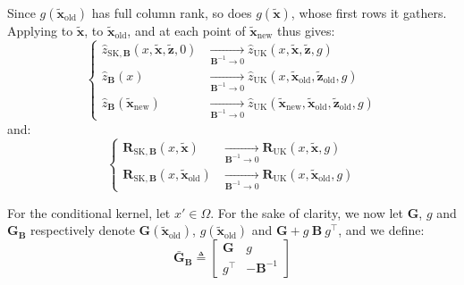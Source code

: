 Since $g(\tilde{\mathbf{x}}_{\mathrm{old}})$ has full column rank, so does $g(\tilde{\mathbf{x}})$, whose first rows it gathers. Applying  to $\tilde{\mathbf{x}}$, to $\tilde{\mathbf{x}}_{\mathrm{old}}$, and at each point of $\tilde{\mathbf{x}}_{\mathrm{new}}$ thus gives:
\begin{equation}
	\left\{\begin{aligned}
	\hat{z}_{\mathrm{SK},\mathbf{B}}(x,\tilde{\mathbf{x}},\tilde{\mathbf{z}},0)&\underset{\mathbf{B}^{-1}\to0}{\longrightarrow}\hat{z}_{\mathrm{UK}}(x,\tilde{\mathbf{x}},\tilde{\mathbf{z}},g)\\
	\hat{z}_{\mathbf{B}}(x)&\underset{\mathbf{B}^{-1}\to0}{\longrightarrow}\hat{z}_{\mathrm{UK}}(x,\tilde{\mathbf{x}}_{\mathrm{old}},\tilde{\mathbf{z}}_{\mathrm{old}},g)\\
	\hat{z}_{\mathbf{B}}(\tilde{\mathbf{x}}_{\mathrm{new}})&\underset{\mathbf{B}^{-1}\to0}{\longrightarrow}\hat{z}_{\mathrm{UK}}(\tilde{\mathbf{x}}_{\mathrm{new}},\tilde{\mathbf{x}}_{\mathrm{old}},\tilde{\mathbf{z}}_{\mathrm{old}},g)
	\end{aligned}\right.
\end{equation}
and:
\begin{equation}
	\left\{\begin{aligned}
	\mathbf{R}_{\mathrm{SK},\mathbf{B}}(x,\tilde{\mathbf{x}})&\underset{\mathbf{B}^{-1}\to0}{\longrightarrow}\mathbf{R}_{\mathrm{UK}}(x,\tilde{\mathbf{x}},g)\\
	\mathbf{R}_{\mathrm{SK},\mathbf{B}}(x,\tilde{\mathbf{x}}_{\mathrm{old}})&\underset{\mathbf{B}^{-1}\to0}{\longrightarrow}\mathbf{R}_{\mathrm{UK}}(x,\tilde{\mathbf{x}}_{\mathrm{old}},g)
	\end{aligned}\right.
\end{equation}

For the conditional kernel, let $x'\in\Omega$. For the sake of clarity, we now let $\mathbf{G}$, $g$ and $\mathbf{G}_{\mathbf{B}}$ respectively denote $\mathbf{G}(\tilde{\mathbf{x}}_{\mathrm{old}})$, $g(\tilde{\mathbf{x}}_{\mathrm{old}})$ and $\mathbf{G}+g\:\mathbf{B}\:g^\top$, and we define:
\begin{equation}
	\bar{\mathbf{G}}_{\mathbf{B}}\triangleq\begin{bmatrix}\mathbf{G}&g\\g^\top&-\mathbf{B}^{-1}\end{bmatrix}
\end{equation}

